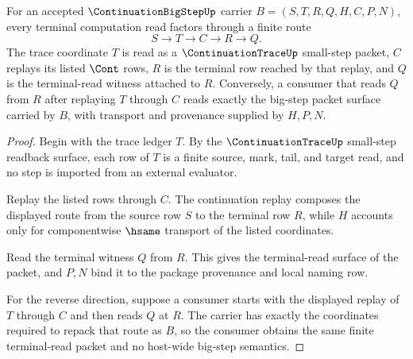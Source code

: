 \begin{theorem}
\label{thm:continuation-big-step-small-step-factorization}
For an accepted $\ContinuationBigStepUp$ carrier $B=(S,T,R,Q,H,C,P,N)$, every terminal computation read factors through a finite route
$$
S \longrightarrow T \longrightarrow C \longrightarrow R \longrightarrow Q.
$$
The trace coordinate $T$ is read as a $\ContinuationTraceUp$ small-step packet, $C$ replays its listed $\Cont$ rows, $R$ is the terminal row reached by that replay, and $Q$ is the terminal-read witness attached to $R$. Conversely, a consumer that reads $Q$ from $R$ after replaying $T$ through $C$ reads exactly the big-step packet surface carried by $B$, with transport and provenance supplied by $H,P,N$.
\end{theorem}
\begin{proof}
Begin with the trace ledger $T$. By the $\ContinuationTraceUp$ small-step readback surface, each row of $T$ is a finite source, mark, tail, and target read, and no step is imported from an external evaluator.

Replay the listed rows through $C$. The continuation replay composes the displayed route from the source row $S$ to the terminal row $R$, while $H$ accounts only for componentwise $\hsame$ transport of the listed coordinates.

Read the terminal witness $Q$ from $R$. This gives the terminal-read surface of the packet, and $P,N$ bind it to the package provenance and local naming row.

For the reverse direction, suppose a consumer starts with the displayed replay of $T$ through $C$ and then reads $Q$ at $R$. The carrier has exactly the coordinates required to repack that route as $B$, so the consumer obtains the same finite terminal-read packet and no host-wide big-step semantics.
\end{proof}

